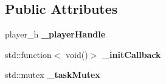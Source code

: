 \subsection*{Public Attributes}
\begin{DoxyCompactItemize}
\item 
\mbox{\label{classexperimental_1_1AudioPlayer_ae1523640a4d235fa007938675559160b}} 
player\+\_\+h {\bfseries \+\_\+player\+Handle}
\item 
\mbox{\label{classexperimental_1_1AudioPlayer_afb4ae4262e1fbfeb650ca49498b4a98f}} 
std\+::function$<$ void()$>$ {\bfseries \+\_\+init\+Callback}
\item 
\mbox{\label{classexperimental_1_1AudioPlayer_a6c36cd00ecc71284a0e081996cb72a43}} 
std\+::mutex {\bfseries \+\_\+task\+Mutex}
\end{DoxyCompactItemize}
